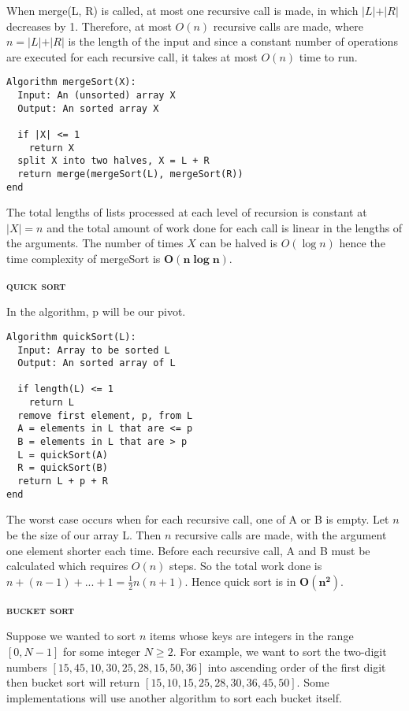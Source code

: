 \documentclass[a4paper]{article}
\begin{document}
\begin{multicols}{2}
\begin{framed}
\noindent
When merge(L, R) is called, at most one recursive call is made, in which $\vert L \vert + \vert R \vert$ decreases by 1. Therefore, at most $O(n)$ recursive calls are made, where $n = \vert L \vert + \vert R \vert $ is the length of the input and since a constant number of operations are executed for each recursive call, it takes at most $O(n)$ time to run.\\

\begin{lstlisting}
Algorithm mergeSort(X):
  Input: An (unsorted) array X
  Output: An sorted array X
  
  if |X| <= 1
    return X
  split X into two halves, X = L + R
  return merge(mergeSort(L), mergeSort(R))
end
\end{lstlisting}

\noindent
The total lengths of lists processed at each level of recursion is constant at $\vert X \vert = n$ and the total amount of work done for each call is linear in the lengths of the arguments. The number of times $X$ can be halved is $O(\log n)$ hence the time complexity of mergeSort is $\bm{O(n \log n)}$.
\end{framed}

\begin{framed}
	\begin{center}
		\textbf{\textsc{quick sort}}
	\end{center}
\noindent
In the algorithm, p will be our pivot.
	\begin{lstlisting}
Algorithm quickSort(L):
  Input: Array to be sorted L
  Output: An sorted array of L
	
  if length(L) <= 1
    return L
  remove first element, p, from L
  A = elements in L that are <= p
  B = elements in L that are > p
  L = quickSort(A)
  R = quickSort(B)
  return L + p + R
end
\end{lstlisting}
	
\noindent
The worst case occurs when for each recursive call, one of A or B is empty.
Let $n$ be the size of our array L.
Then $n$ recursive calls are made, with the argument one element shorter each time.
Before each recursive call, A and B must be calculated which requires $O(n)$ steps.
So the total work done is $n+(n-1)+...+1=\frac{1}{2}n(n+1)$.
Hence quick sort is in $\bm{O(n^2)}$.

\end{framed}

\begin{framed}
	\begin{center}
		\textbf{\textsc{bucket sort}}
	\end{center}
\noindent
Suppose we wanted to sort $n$ items whose keys are integers in the range $[0, N - 1]$ for some integer $N \geq 2$. For example, we want to sort the two-digit numbers $[15, 45, 10, 30, 25, 28, 15, 50, 36]$ into ascending order of the first digit then bucket sort will return $[15, 10, 15, 25, 28, 30 , 36, 45, 50]$. Some implementations will use another algorithm to sort each bucket itself. 


\end{framed}
\end{multicols}
\end{document}
